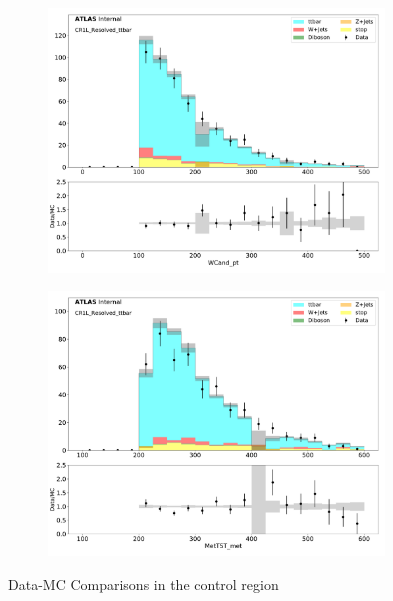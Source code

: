 \begin{figure}[htbp]
\begin{subfigure}{0.49\textwidth}
     \includegraphics[width = 0.98\textwidth]{Figures/4/datamc/CR1L_Resolved_ttbar/WCand_pt.pdf}
     \caption{\Wcandpt}
     \end{subfigure}
     \begin{subfigure}{0.49\textwidth}
     \includegraphics[width = 0.98\textwidth]{Figures/4/datamc/CR1L_Resolved_ttbar/MetTST_met.pdf}
     \caption{\met}
     \end{subfigure}

\caption{Data-MC Comparisons in the \resolved \ttbar control region}
\label{fig:Data_MC_CRbV_resolved}
\end{figure}


